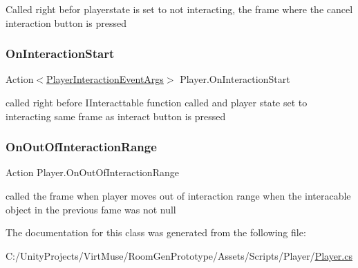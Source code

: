Called right befor playerstate is set to not interacting, the frame where the cancel interaction button is pressed 

\mbox{\label{class_player_a22eae36e514445cac4172890ed186638}} 
\subsubsection{\texorpdfstring{On\+Interaction\+Start}{OnInteractionStart}}
{\footnotesize\ttfamily Action$<$\mbox{\hyperlink{class_player_interaction_event_args}{Player\+Interaction\+Event\+Args}}$>$ Player.\+On\+Interaction\+Start}



called right before I\+Interacttable function called and player state set to interacting same frame as interact button is pressed 

\mbox{\label{class_player_ad50fff09d9eef70c9884f232010cb859}} 
\subsubsection{\texorpdfstring{On\+Out\+Of\+Interaction\+Range}{OnOutOfInteractionRange}}
{\footnotesize\ttfamily Action Player.\+On\+Out\+Of\+Interaction\+Range}





called the frame when player moves out of interaction range when the interacable object in the previous fame was not null 

The documentation for this class was generated from the following file\+:\begin{DoxyCompactItemize}
\item 
C\+:/\+Unity\+Projects/\+Virt\+Muse/\+Room\+Gen\+Prototype/\+Assets/\+Scripts/\+Player/\mbox{\hyperlink{_player_8cs}{Player.\+cs}}\end{DoxyCompactItemize}
